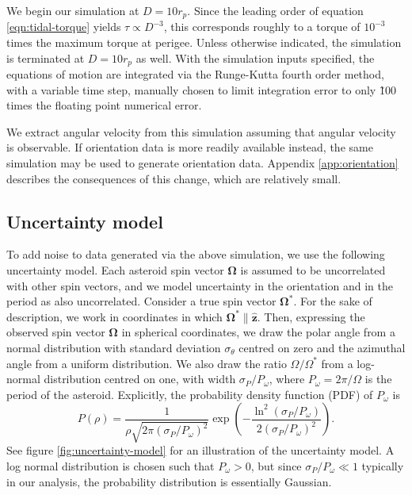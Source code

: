 \documentclass[fleqn,usenatbib]{mnras}
\renewcommand{\unit}[1]{\bm{\hat{#1}}}
\newcommand{\parens}[1]{\left( #1 \right)}
\begin{document}
We begin our simulation at $D = 10 r_p$. Since the leading order of equation \ref{eqn:tidal-torque} yields $\tau \propto D^{-3}$, this corresponds roughly to a torque of $10^{-3}$ times the maximum torque at perigee. Unless otherwise indicated, the simulation is terminated at $D=10 r_p$ as well. With the simulation inputs specified, the equations of motion are integrated via the Runge-Kutta fourth order method, with a variable time step, manually chosen to limit integration error to only \~100 times the floating point numerical error.

We extract angular velocity from this simulation assuming that angular velocity is observable. If orientation data is more readily available instead, the same simulation may be used to generate orientation data. Appendix \ref{app:orientation} describes the consequences of this change, which are relatively small.



\subsection{Uncertainty model}
\label{sec:uncertainty}

To add noise to data generated via the above simulation, we use the following uncertainty model. Each asteroid spin vector $\bm \Omega$ is assumed to be uncorrelated with other spin vectors, and we model uncertainty in the orientation and in the period as also uncorrelated. Consider a true spin vector $\bm \Omega^*$. For the sake of description, we work in coordinates in which $\bm \Omega^* \parallel \unit z$. Then, expressing the observed spin vector $\bm \Omega$ in spherical coordinates, we draw the polar angle from a normal distribution with standard deviation $\sigma_\theta$ centred on zero and the azimuthal angle from a uniform distribution. We also draw the ratio $\Omega/\Omega^*$ from a log-normal distribution centred on one, with width $\sigma_P / P_\omega$, where $P_\omega = 2\pi / \Omega$ is the period of the asteroid. Explicitly, the probability density function (PDF) of $P_\omega$ is 
\begin{equation}
  P(\rho) = \frac{1}{\rho\sqrt{2\pi (\sigma_P / P_\omega)^2}} \exp\parens{-\frac{\ln^2(\sigma_P / P_\omega)}{2(\sigma_P / P_\omega)^2}}.
\end{equation}
See figure \ref{fig:uncertainty-model} for an illustration of the uncertainty model. A log normal distribution is chosen such that $P_\omega > 0$, but since $\sigma_P/P_\omega \ll 1$ typically in our analysis, the probability distribution is essentially Gaussian.
\end{document}
